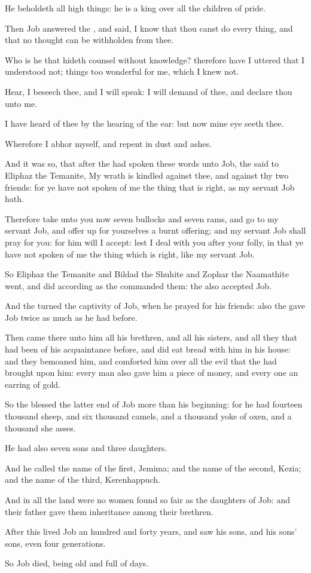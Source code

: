 \Verse He beholdeth all high things: he is a king over all the children of pride.


\Chapter
\Verse Then Job answered the \LORD, and said, \Verse I know that thou canst do every thing, and that no thought can be withholden from thee.

\Verse Who is he that hideth counsel without knowledge? therefore have I uttered that I understood not; things too wonderful for me, which I knew not.

\Verse Hear, I beseech thee, and I will speak: I will demand of thee, and declare thou unto me.

\Verse I have heard of thee by the hearing of the ear: but now mine eye seeth thee.

\Verse Wherefore I abhor myself, and repent in dust and ashes.

\Verse And it was so, that after the \LORD had spoken these words unto Job, the \LORD said to Eliphaz the Temanite, My wrath is kindled against thee, and against thy two friends: for ye have not spoken of me the thing that is right, as my servant Job hath.

\Verse Therefore take unto you now seven bullocks and seven rams, and go to my servant Job, and offer up for yourselves a burnt offering; and my servant Job shall pray for you: for him will I accept: lest I deal with you after your folly, in that ye have not spoken of me the thing which is right, like my servant Job.

\Verse So Eliphaz the Temanite and Bildad the Shuhite and Zophar the Naamathite went, and did according as the \LORD commanded them: the \LORD also accepted Job.

\Verse And the \LORD turned the captivity of Job, when he prayed for his friends: also the \LORD gave Job twice as much as he had before.

\Verse Then came there unto him all his brethren, and all his sisters, and all they that had been of his acquaintance before, and did eat bread with him in his house: and they bemoaned him, and comforted him over all the evil that the \LORD had brought upon him: every man also gave him a piece of money, and every one an earring of gold.

\Verse So the \LORD blessed the latter end of Job more than his beginning: for he had fourteen thousand sheep, and six thousand camels, and a thousand yoke of oxen, and a thousand she asses.

\Verse He had also seven sons and three daughters.

\Verse And he called the name of the first, Jemima; and the name of the second, Kezia; and the name of the third, Kerenhappuch.

\Verse And in all the land were no women found so fair as the daughters of Job: and their father gave them inheritance among their brethren.

\Verse After this lived Job an hundred and forty years, and saw his sons, and his sons' sons, even four generations.

\Verse So Job died, being old and full of days.

